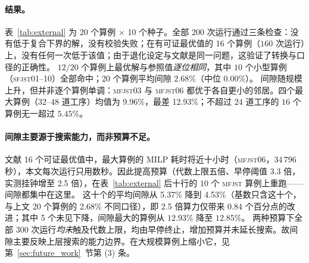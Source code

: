 \documentclass[manuscript,screen,review]{acmart}
\newcommand{\NSeeds}{10}
\newcommand{\PubNInst}{20}
\newcommand{\PubNOpt}{16}                 %
\newcommand{\PubNMatch}{12}               %
\newcommand{\PubGapMean}{2.68\%}          %
\newcommand{\PubGapMed}{0.00\%}
\newcommand{\PubGapMax}{12.93\%}
\newcommand{\PubGapBig}{9.96\%}           %
\newcommand{\PubGapMeanSeed}{5.29\%}      %
\newcommand{\PubBudgetRatio}{2.5}
\newcommand{\PubGapLoBudget}{5.37\%}      %
\newcommand{\PubGapHiBudget}{4.53\%}      %
\newcommand{\PubBudgetGainPP}{0.84}       %
\newcommand{\PubBudgetNoGain}{5}          %
\newcommand{\PubLBSlack}{10.3\%}          %
\newcommand{\PubLBTotal}{10.8\%}          %
\begin{document}
\paragraph{结果。}
表~\ref{tab:external} 为 \PubNInst{} 个算例 $\times$ \NSeeds{} 个种子。全部 $200$ 次运行通过三条检查：没有低于复合下界的解，没有校验失败；在有可证最优值的 \PubNOpt{} 个算例（$160$ 次运行）上，没有任何一次低于该值；由于退化设定与文献是同一问题，这验证了转换与口径的正确性。
$\PubNMatch{}/\PubNInst{}$ 个算例上最优解与参照值\emph{逐位相同}，其中 $10$ 个小型算例（\textsc{sfjst}01--10）全部命中；\PubNInst{} 个算例平均间隙 \PubGapMean{}（中位 \PubGapMed{}）。
间隙随规模上升，但并非逐个算例单调：\textsc{mfjst}03 与 \textsc{mfjst}06 都优于各自更小的邻居。四个最大算例（$32$--$48$ 道工序）均值为 \PubGapBig{}，最差 \PubGapMax{}；不超过 $24$ 道工序的 $16$ 个算例无一超过 $5.45\%$。

\begin{table}[t]
\caption{公开基准上的退化比较（删去排他约束，与文献同一问题）。「参照」列的
\textsc{opt} 为 MILP 证明的最优值、\textsc{bk} 为已发表最好值；间隙以 \NSeeds{} 个种子的最优
解计。星号标出最优解与参照值逐位相同者。}
\label{tab:external}
\centering
\small

\end{table}

\paragraph{间隙主要源于搜索能力，而非预算不足。}
文献 \PubNOpt{} 个可证最优值中，最大算例的 MILP 耗时将近十小时（\textsc{mfjst}06，$34\,796$ 秒），本文每次运行只用数秒。因此提高预算（代数上限五倍、早停阈值 $3.3$ 倍，实测挂钟增至 \PubBudgetRatio{} 倍），在表~\ref{tab:external} 后十行的 $10$ 个 \textsc{mfjst} 算例上重跑——间隙都集中在这里。
这十个的平均间隙从 \PubGapLoBudget{} 降到 \PubGapHiBudget{}（基数只含这十个，与上文 \PubNInst{} 个算例的 \PubGapMean{} 不同口径），即 \PubBudgetRatio{} 倍算力仅带来 $\PubBudgetGainPP$ 个百分点的改进；其中 \PubBudgetNoGain{} 个未见下降，间隙最大的算例从 $12.93\%$ 降至 $12.85\%$。
两种预算下全部 $300$ 次运行\emph{均未}触及代数上限，均由早停终止，增加预算并未延长搜索。故间隙主要反映上层搜索的能力边界。在大规模算例上缩小它，见第~\ref{sec:future_work}~节第 (3) 条。
\end{document}
